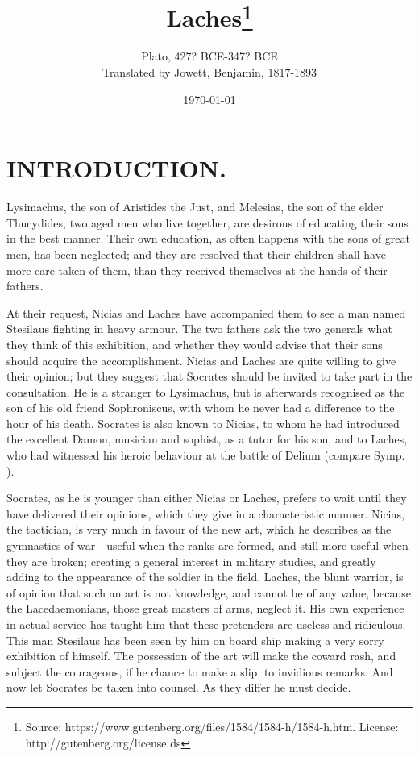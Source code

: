 \documentclass[11pt,letter]{article}
\begin{document}
\title{Laches\thanks{Source: https://www.gutenberg.org/files/1584/1584-h/1584-h.htm. License: http://gutenberg.org/license ds}}
\date{\today}
\author{Plato, 427? BCE-347? BCE\\ Translated by Jowett, Benjamin, 1817-1893}
\maketitle

\setcounter{tocdepth}{1}
\tableofcontents
\renewcommand{\baselinestretch}{1.0}
\normalsize
\newpage

\section{
      INTRODUCTION.
    }
\par  Lysimachus, the son of Aristides the Just, and Melesias, the son of the elder Thucydides, two aged men who live together, are desirous of educating their sons in the best manner. Their own education, as often happens with the sons of great men, has been neglected; and they are resolved that their children shall have more care taken of them, than they received themselves at the hands of their fathers.

\par  At their request, Nicias and Laches have accompanied them to see a man named Stesilaus fighting in heavy armour. The two fathers ask the two generals what they think of this exhibition, and whether they would advise that their sons should acquire the accomplishment. Nicias and Laches are quite willing to give their opinion; but they suggest that Socrates should be invited to take part in the consultation. He is a stranger to Lysimachus, but is afterwards recognised as the son of his old friend Sophroniscus, with whom he never had a difference to the hour of his death. Socrates is also known to Nicias, to whom he had introduced the excellent Damon, musician and sophist, as a tutor for his son, and to Laches, who had witnessed his heroic behaviour at the battle of Delium (compare Symp. ).

\par  Socrates, as he is younger than either Nicias or Laches, prefers to wait until they have delivered their opinions, which they give in a characteristic manner. Nicias, the tactician, is very much in favour of the new art, which he describes as the gymnastics of war—useful when the ranks are formed, and still more useful when they are broken; creating a general interest in military studies, and greatly adding to the appearance of the soldier in the field. Laches, the blunt warrior, is of opinion that such an art is not knowledge, and cannot be of any value, because the Lacedaemonians, those great masters of arms, neglect it. His own experience in actual service has taught him that these pretenders are useless and ridiculous. This man Stesilaus has been seen by him on board ship making a very sorry exhibition of himself. The possession of the art will make the coward rash, and subject the courageous, if he chance to make a slip, to invidious remarks. And now let Socrates be taken into counsel. As they differ he must decide.
\end{document}
